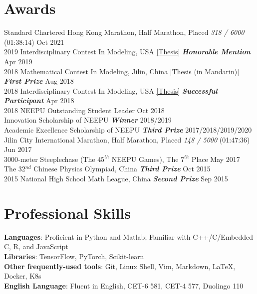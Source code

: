 \documentclass{my_cv}
\begin{document}
\hspace*{\fill}

\section{Awards}

 Standard Chartered Hong Kong Marathon, Half Marathon, Placed \emph{318 / 6000} (01:38:14) \hfill Oct 2021 \\
2019 Interdisciplinary Contest In Modeling, USA \href{https://shuyuej.com/files/ICM-2019.pdf}{[Thesis]}  \textbf{\emph{Honorable Mention}} \hfill Apr 2019 \\
2018 Mathematical Contest In Modeling, Jilin, China \href{https://shuyuej.com/files/MCM-2018.pdf}{[Thesis (in Mandarin)]}  \textbf{\emph{First Prize}} \hfill Aug 2018 \\
2018 Interdisciplinary Contest In Modeling, USA \href{https://shuyuej.com/files/ICM-2018.pdf}{[Thesis]}  \textbf{\emph{Successful Participant}} \hfill Apr 2018 \\
2018 NEEPU Outstanding Student Leader \hfill Oct 2018 \\
Innovation Scholarship of NEEPU  \textbf{\emph{Winner}} \hfill 2018/2019 \\
Academic Excellence Scholarship of NEEPU  \textbf{\emph{Third Prize}} \hfill 2017/2018/2019/2020 \\
Jilin City International Marathon, Half Marathon, Placed \emph{148 / 5000} (01:47:36) \hfill Jun 2017 \\
3000-meter Steeplechase (The $45^{th}$ NEEPU Games), The $7^{th}$ Place \hfill May 2017 \\
The 32$^{nd}$ Chinese Physics Olympiad, China  \textbf{\emph{Third Prize}} \hfill Oct 2015 \\
2015 National High School Math League, China  \textbf{\emph{Second Prize}} \hfill Sep 2015

\hspace*{\fill}

\section{Professional Skills}

\noindent \textbf{Languages}: Proficient in Python and Matlab; Familiar with C++/C/Embedded C, R, and JavaScript \\
\textbf{Libraries}: TensorFlow, PyTorch, Scikit-learn \\
\textbf{Other frequently-used tools}: Git, Linux Shell, Vim, Markdown, \LaTeX, Docker, K8s \\
\textbf{English Language}: Fluent in English, CET-6 581, CET-4 577, Duolingo 110
\end{document}
